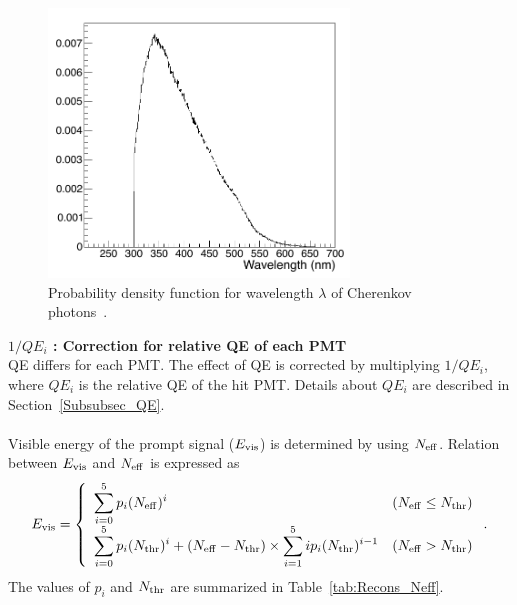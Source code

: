 \begin{figure}[h]
	\centering
	\includegraphics[width=8cm]{Figures/Reconstruction/PDF_wavelength}
	\caption[Probability density function for wavelength $\lambda$ of Cherenkov photons]{
	Probability density function for wavelength $\lambda$ of Cherenkov photons~\cite{2021ShinokiMas}.
	}\label{Recons_PDF_wavelength}
\end{figure}

\textbf{$1/QE_{i}$ : Correction for relative QE of each PMT}\\
\hs
QE differs for each PMT.
The effect of QE is corrected by multiplying $1/QE_{i}$, where $QE_{i}$ is the relative QE of the hit PMT.
Details about $QE_{i}$ are described in Section~\ref{Subsubsec_QE}.\\
\\
\hs
Visible energy of the prompt signal ($E_{\rm vis}$) is determined by using $N_{\rm eff}$.
Relation between $E_{{\rm vis}}$ and $N_{\rm eff}$ is expressed as 
\begin{eqnarray}
	E_{\rm vis} =
	\left\{
	\begin{array}{ll}
		\displaystyle \sum_{i=0}^{5} p_{i}(N_{\rm eff})^{i}                                                                                 & (N_{\rm eff} \leq N_{\rm thr}) \\
		\displaystyle \sum_{i=0}^{5} p_{i}(N_{\rm thr})^{i} + (N_{\rm eff} - N_{\rm thr}) \times \sum_{i=1}^{5} ip_{i}(N_{\rm thr})^{i - 1} & (N_{\rm eff} > N_{\rm thr})
	\end{array} \right..
\end{eqnarray}
The values of $p_{i}$ and $N_{\rm thr}$ are summarized in Table~\ref{tab:Recons_Neff}.

